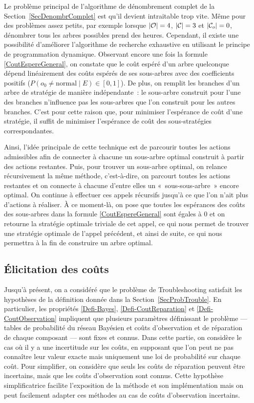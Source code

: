 \documentclass[a4paper,11pt]{article}
\theoremstyle{plain}
\theoremstyle{definition}
\DeclarePairedDelimiter{\abs}{\lvert}{\rvert}
\begin{document}
Le problème principal de l'algorithme de dénombrement complet de la Section~\ref{SecDenombrComplet} est qu'il devient intraitable trop vite. Même pour des problèmes assez petits, par exemple lorsque $\abs{\mathcal O} = 4$, $\abs{\mathcal C} = 3$ et $\abs{\mathcal C_o} = 0$, dénombrer tous les arbres possibles prend des heures. Cependant, il existe une possibilité d'améliorer l'algorithme de recherche exhaustive en utilisant le principe de programmation dynamique. Observant encore une fois la formule \eqref{CoutEspereGeneral}, on constate que le coût espéré d'un arbre quelconque dépend linéairement des coûts espérés de ses sous-arbres avec des coefficients positifs ($P(o_0 \neq \text{normal} \mid E) \in \left[0, 1\right]$). De plus, on remplit les branches d'un arbre de stratégie de manière indépendante~: le sous-arbre construit pour l'une des branches n'influence pas les sous-arbres que l'on construit pour les autres branches. C'est pour cette raison que, pour minimiser l'espérance de coût d'une stratégie, il suffit de minimiser l'espérance de coût des sous-stratégies correspondantes.

Ainsi, l'idée principale de cette technique est de parcourir toutes les actions admissibles afin de connecter à chacune un sous-arbre optimal construit à partir des actions restantes. Puis, pour trouver un sous-arbre optimal, on relance récursivement la même méthode, c'est-à-dire, on parcourt toutes les actions restantes et on connecte à chacune d'entre elles un «~sous-sous-arbre~» encore optimal. On continue à effectuer ces appels récursifs jusqu'à ce que l'on n'ait plus d'actions à réaliser. À ce moment-là, on pose que toutes les espérances des coûts des sous-arbres dans la formule \eqref{CoutEspereGeneral} sont égales à $0$ et on retourne la stratégie optimale triviale de cet appel, ce qui nous permet de trouver une stratégie optimale de l'appel précédent, et ainsi de suite, ce qui nous permettra à la fin de construire un arbre optimal.

\subsection{Élicitation des coûts}
\label{SecContribElicitation}

Jusqu'à présent, on a considéré que le problème de Troubleshooting satisfait les hypothèses de la définition donnée dans la Section~\ref{SecProbTrouble}. En particulier, les propriétés \ref{Defi-Bayes}, \ref{Defi-CoutReparation} et \ref{Defi-CoutObservation} impliquent que plusieurs paramètres définissant le problème --- tables de probabilité du réseau Bayésien et coûts d'observation et de réparation de chaque composant --- sont fixes et connus. Dans cette partie, on considère le cas où il y a une incertitude sur les coûts, en supposant que l'on peut ne pas connaître leur valeur exacte mais uniquement une loi de probabilité sur chaque coût. Pour simplifier, on considère que seuls les coûts de réparation peuvent être incertains, mais que les coûts d'observation sont connus. Cette hypothèse simplificatrice facilite l'exposition de la méthode et son implémentation mais on peut facilement adapter ces méthodes au cas de coûts d'observation incertains.
\end{document}
